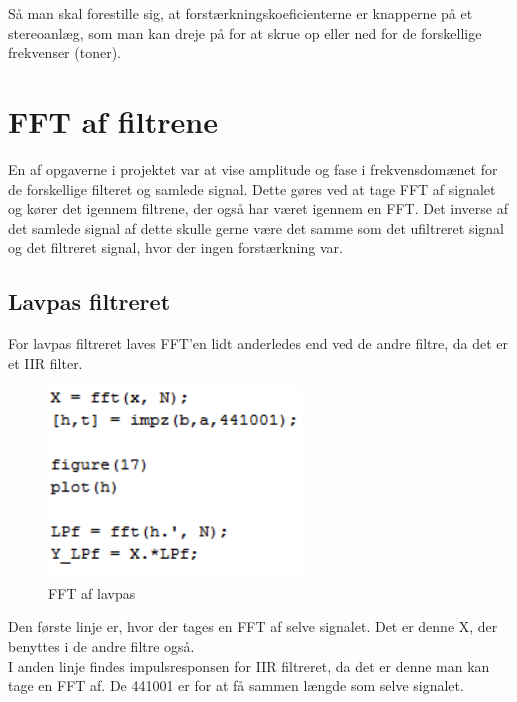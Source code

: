 Så man skal forestille sig, at forstærkningskoeficienterne er knapperne på et stereoanlæg, som man kan dreje på for at skrue op eller ned for de forskellige frekvenser (toner). 

\section{FFT af filtrene}
En af opgaverne i projektet var at vise amplitude og fase i frekvensdomænet for de forskellige filteret og samlede signal. Dette gøres ved at tage FFT af signalet og kører det igennem filtrene, der også har været igennem en FFT. 
Det inverse af det samlede signal af dette skulle gerne være det samme som det ufiltreret signal og det filtreret signal, hvor der ingen forstærkning var.  

\subsection{Lavpas filtreret}
For lavpas filtreret laves FFT'en lidt anderledes end ved de andre filtre, da det er et IIR filter. 

\begin{figure}[H]
	\centering
	\includegraphics[width=0.6\textwidth]{Figur/Snip20151111_71}
	\caption{FFT af lavpas}
\end{figure}

Den første linje er, hvor der tages en FFT af selve signalet. Det er denne X, der benyttes i de andre filtre også. 
\\
I anden linje findes impulsresponsen for IIR filtreret, da det er denne man kan tage en FFT af. De 441001 er for at få sammen længde som selve signalet. 

